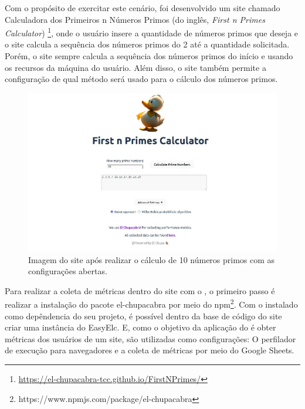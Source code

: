 \documentclass[12pt]{tcc}
\begin{document}

Com o propósito de exercitar este cenário, foi desenvolvido um site chamado Calculadora dos Primeiros n Números Primos (do inglês, \emph{First n Primes Calculator})
\footnote{\url{https://el-chupacabra-tcc.github.io/FirstNPrimes/}}, onde o usuário insere a quantidade de números primos que deseja e o site calcula a sequência dos números primos do 2 até a quantidade solicitada.
Porém, o site sempre calcula a sequência dos números primos do início e usando os recursos da máquina do usuário.
Além disso, o site também permite a configuração de qual método será usado para o cálculo dos números primos.

\begin{figure}[!ht]
	\centering
	\includegraphics[width=1\textwidth]{figures/print-elc-numeros-primos.jpeg}
	\caption{Imagem do site após realizar o cálculo de 10 números primos com as configurações abertas.}
	\label{fig:site-numeros-primos}
\end{figure}

Para realizar a coleta de métricas dentro do site com o , o primeiro passo é realizar a instalação do pacote el-chupacabra por meio do npm\footnote{https://www.npmjs.com/package/el-chupacabra}.
Com o  instalado como depêndencia do seu projeto, é possível dentro da base de código do site criar uma instância do EasyElc.
E, como o objetivo da aplicação do  é obter métricas dos usuários de um site, são utilizadas como configurações: O perfilador de execução para navegadores e a coleta de métricas por meio do Google Sheets.

\end{document}
